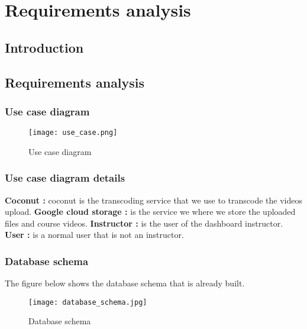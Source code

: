 \chapter{Requirements analysis}
\minitoc
\newpage
\section*{Introduction}
\section{Requirements analysis}

\subsection{Use case diagram}

\begin{figure}[!ht]
    \centering
    \texttt{[image: use\_case.png]}
    \caption{Use case diagram}
    \label{fig:use_case}
\end{figure}


\subsection{Use case diagram details}
\hfill \break
\textbf{Coconut :} coconut is the transcoding service that we use to transcode the videos upload.
\hfill \break
\textbf{Google cloud storage :} is the service we where we store the uploaded files and course videos.
\hfill \break
\textbf{Instructor :} is the user of the dashboard instructor.
\hfill \break
\textbf{User :} is a normal user that is not an instructor.
 

\subsection{Database schema}

The figure below shows the database schema that is already built.

\begin{figure}[!ht]
    \centering
    \texttt{[image: database\_schema.jpg]}
    \caption{Database schema}
    \label{fig:database_schema}
\end{figure}


